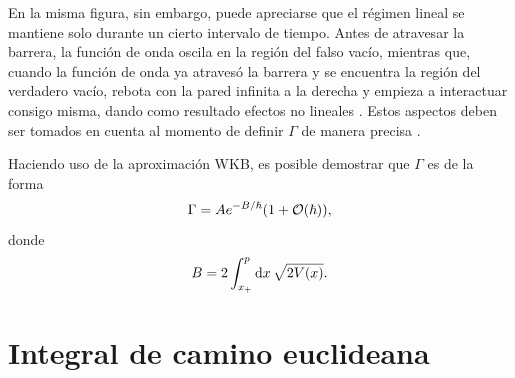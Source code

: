 En la misma figura, sin embargo, puede apreciarse que el régimen lineal se mantiene solo durante un cierto intervalo de tiempo. Antes de atravesar la barrera, la función de onda oscila en la región del falso vacío,
mientras que, cuando la función de onda ya atravesó la barrera y se encuentra la región del verdadero vacío, rebota con la pared infinita a la derecha y empieza a interactuar consigo misma, dando como resultado efectos no lineales \cite{Masoumi:2015psa}. Estos aspectos deben ser tomados en cuenta al momento de definir $\Gamma$ de manera precisa \cite{andreassen2017precision}. 




Haciendo uso de la aproximación WKB, es posible demostrar que $\Gamma$ es de la forma \cite{coleman1977fate}
\begin{equation} \label{eq:gamma_WKB}
\Gamma = Ae^{-B/\hbar}\qty(1 + \order{\hbar}),
\end{equation}
donde 
\begin{equation} \label{eq:B_WKB}
B = 2 \int_{x_+}^{p} \dd{x} \sqrt{2V\qty(x)}. 
\end{equation}

\section{Integral de camino euclideana}



